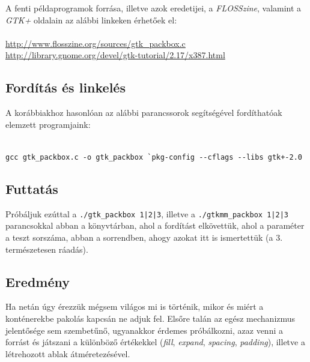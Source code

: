 \documentclass[a4paper,10pt]{article}
\begin{document}
A fenti példaprogramok forrása, illetve azok eredetijei, a \textit{FLOSSzine}, valamint a \textit{GTK+} oldalain az alábbi linkeken érhetőek el:
\ \\\\
\url{http://www.flosszine.org/sources/gtk_packbox.c}\\
\url{http://library.gnome.org/devel/gtk-tutorial/2.17/x387.html}\\

\subsection{Fordítás és linkelés}

A korábbiakhoz hasonlóan az alábbi parancssorok segítségével fordíthatóak elemzett programjaink:

\fontsize{8pt}{8pt}
\ \\
\texttt{gcc gtk\_packbox.c -o gtk\_packbox \`{}pkg-config {-}-cflags {-}-libs gtk+-2.0}

\subsection{Futtatás}

Próbáljuk ezúttal a \texttt{./gtk\_packbox 1|2|3}, illetve a \texttt{./gtkmm\_packbox 1|2|3} parancsokkal abban a könyvtárban, ahol a fordítást elkövettük, ahol a paraméter a teszt sorszáma, abban a sorrendben, ahogy azokat itt is ismertettük (a 3. természetesen ráadás).

\subsection{Eredmény}

Ha netán úgy érezzük mégsem világos mi is történik, mikor és miért a konténerekbe pakolás kapcsán ne adjuk fel. Elsőre talán az egész mechanizmus jelentősége sem szembetűnő, ugyanakkor érdemes próbálkozni, azaz venni a forrást és játszani a különböző értékekkel (\textit{fill}, \textit{expand}, \textit{spacing}, \textit{padding}), illetve a létrehozott ablak átméretezésével.

\nocite{gtktut}
\nocite{gtkmmtut}
\nocite{ggad}
\nocite{gtktutmagy}



\end{document}
